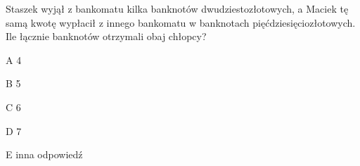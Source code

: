 \begin{tresc}
Staszek wyjął z bankomatu kilka banknotów dwudziestozłotowych, a Maciek tę samą kwotę wypłacił z innego bankomatu w banknotach pięćdziesięciozłotowych. Ile łącznie banknotów otrzymali obaj chłopcy?
\end{tresc}
\begin{wariant}{A} 4 \end{wariant}
\begin{wariant}{B} 5 \end{wariant}
\begin{wariant}{C} 6 \end{wariant}
\begin{wariant}{D} 7 \end{wariant}
\begin{wariant}{E} inna odpowiedź \end{wariant}
